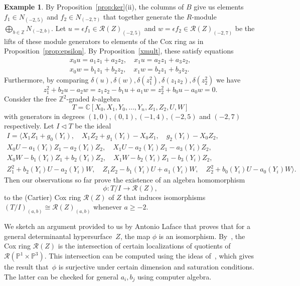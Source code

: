 \documentclass[a4paper,11pt]{amsart}
\theoremstyle{plain}
\newtheorem{conjecture}[theorem]{Conjecture}
\theoremstyle{definition}
\newtheorem{example}[theorem]{Example}
\newcommand{\C}{\mathbb{C}}
\newcommand{\p}{\mathbb{P}}
\newcommand{\R}{\mathcal{R}}
\newcommand{\Z}{\mathbb{Z}}
\begin{document}
\begin{example}
By Proposition~\ref{prop:ker}(ii), the columns of $B$ give us elements $f_1\in N_{(-2,5)}$ and $f_2\in N_{(-2,7)}$ that together generate the $R$-module $\bigoplus_{b \in \Z} N_{(-2,b)}$. Let $u=\epsilon f_1 \in \R(Z)_{(-2,5)}$ and $w =\epsilon f_2\in \R(Z)_{(-2,7)}$ be the lifts of these module generators to elements of the Cox ring as in Proposition~\ref{prop:epsilon}. By Proposition~\ref{xmult}, these satisfy equations
\begin{align*}
    x_0 u = a_1 z_1 + a_2 z_2, \quad x_1 u = a_2 z_1 + a_3 z_2, \\
    x_0 w = b_1 z_1 + b_2 z_2, \quad x_1 w = b_2 z_1 + b_3 z_2.
\end{align*}
Furthermore, by comparing $\delta(u), \delta(w),\delta(z_1^2),\delta(z_1 z_2),\delta(z_2^2)$ we have
\begin{equation*}
    z_1^2 + b_2 u - a_2 w = z_1 z_2 - b_1 u + a_1 w = z_2^2 + b_0 u - a_0 w = 0.
\end{equation*}
Consider the free $\Z^2$-graded $k$-algebra \[
    T = \C[X_0,X_1,Y_0, \dots,Y_n,Z_1,Z_2,U,W]
    \]
    with generators in degrees $(1,0), (0,1), (-1,4), (-2,5)$ and $(-2,7)$ respectively. Let $I \lhd T$ be the ideal 
    \begin{gather*}
       I= \langle X_1 Z_1 + g_0(Y_i), \quad X_1 Z_2 + g_1(Y_i) - X_0 Z_1, \quad g_2(Y_i) - X_0 Z_2,\\
        X_0 U - a_1(Y_i) Z_1 - a_2(Y_i) Z_2, \quad X_1 U - a_2(Y_i) Z_1 - a_3(Y_i) Z_2, \\
    X_0 W - b_1(Y_i) Z_1 + b_2(Y_i) Z_2, \quad X_1 W - b_2(Y_i) Z_1 - b_3(Y_i) Z_2,\\
    Z_1^2 + b_2(Y_i) U - a_2(Y_i) W, \quad Z_1 Z_2 - b_1(Y_i) U + a_1(Y_i) W, \quad Z_2^2 + b_0(Y_i) U - a_0(Y_i) W\rangle.
    \end{gather*}
    Then our observations so far prove the existence of an algebra homomorphism 
    \[
    \phi: T/I \rightarrow \R(Z),
    \]
 to the (Cartier) Cox ring  $\R(Z)$ of $Z$ that induces isomorphisms $(T/I)_{(a,b)} \cong \R(Z)_{(a,b)}$ whenever $a \geq -2$.


We sketch an argument provided to us by Antonio Laface that proves that for a general determinantal hypersurface~$Z$, the map $\phi$ 
is an isomorphism. By~\cite[Thm.1]{lafaceetal}, the Cox ring $\R(Z)$ is the intersection of certain localizations of quotients
of~$\R(\p^1\times\p^3)$. This intersection can be computed using the ideas of~\cite[Cor.2.4]{lafaceetal}, which gives the result that~$\phi$ is surjective under certain dimension and saturation conditions. The latter can be checked for general $a_i,b_j$ using computer algebra.
\end{example} 
\end{document}
